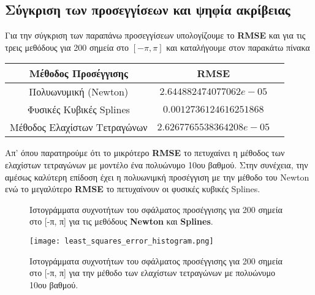 \documentclass[Second Project.tex]{subfiles}
\begin{document}
\subsection{ Σύγκριση των προσεγγίσεων και ψηφία ακρίβειας }

Για την σύγκριση των παραπάνω προσεγγίσεων υπολογίζουμε το \textlatin{\textbf{RMSE}} και για τις τρεις μεθόδους για 200
σημεία στο $[-\pi, \pi]$ και καταλήγουμε στον παρακάτω πίνακα
\vspace{5mm}
\begin{center}
    \begin{tabular}{ |c|c|c| } 
     \hline
     Μέθοδος Προσέγγισης & \textlatin{RMSE} \\
     \hline
     Πολυωνυμική (\textlatin{Newton}) & $2.644882474077062e-05$ \\
     \hline
     Φυσικές Κυβικές \textlatin{Splines} & $0.0012736124616251868$ \\ 
     \hline
     Μέθοδος Ελαχίστων Τετραγώνων & $2.6267765538364208e-05$ \\
     \hline
    \end{tabular}
\end{center}
\vspace{5mm}
Απ' όπου παρατηρούμε ότι το μικρότερο \textlatin{\textbf{RMSE}} το πετυχαίνει η μέθοδος των ελαχίστων τετραγώνων 
με μοντέλο ένα πολυώνυμο 10ου βαθμού. Στην συνέχεια, την αμέσως καλύτερη επίδοση έχει η πολυωνιμκή προσέγγιση με την
μέθοδο του \textlatin{Newton} ενώ το μεγαλύτερο \textlatin{\textbf{RMSE}} το πετυχαίνουν οι φυσικές κυβικές 
\textlatin{Splines}.
\vspace{5mm}
\begin{figure}[h!]
    \centering
    \captionsetup{justification=centering}
    \quad
    \caption{ Ιστογράμματα συχνοτήτων του σφάλματος προσέγγισης για 200 σημεία στο [-π, π] για τις 
    μεθόδους \textlatin{\textbf{Newton}} και \textlatin{\textbf{Splines}}.}
\end{figure}
\vspace{5px}
\begin{figure}[h!]
    \centering
    \captionsetup{justification=centering}
    \begin{center}
        \texttt{[image: least\_squares\_error\_histogram.png]}    
        \caption{ Ιστογράμματα συχνοτήτων του σφάλματος προσέγγισης για 200 σημεία στο [-π, π] για την μέθοδο των ελαχίστων τετραγώνων 
        με πολυώνυμο 10ου βαθμού.}
    \end{center}
\end{figure}
\end{document}
